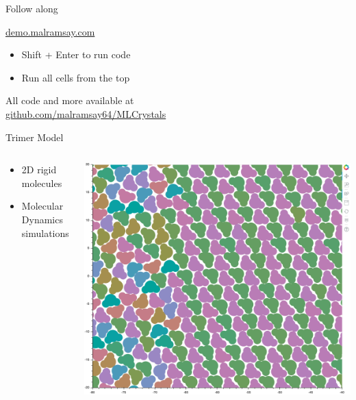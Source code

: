 \documentclass[aspectratio=169, 14pt]{beamer}
\begin{document}
\begin{frame}[label=follow-along]{Follow along}

  \begin{center}
    \LARGE
    \url{demo.malramsay.com}
  \end{center}

  \begin{itemize}
    \item Shift + Enter to run code
    \item Run all cells from the top
  \end{itemize}

  All code and more available at \\
  \url{github.com/malramsay64/MLCrystals}

\end{frame}

\begin{frame}{Trimer Model}

  \begin{columns}
    \begin{column}{0.4\textwidth}
      \begin{itemize}
        \item 2D rigid molecules
        \item Molecular Dynamics simulations
      \end{itemize}
    \end{column}
    \begin{column}{0.6\textwidth}
      \includegraphics[width=\textwidth]{Trimer_snapshot.png}
    \end{column}
  \end{columns}
\end{frame}
\end{document}
